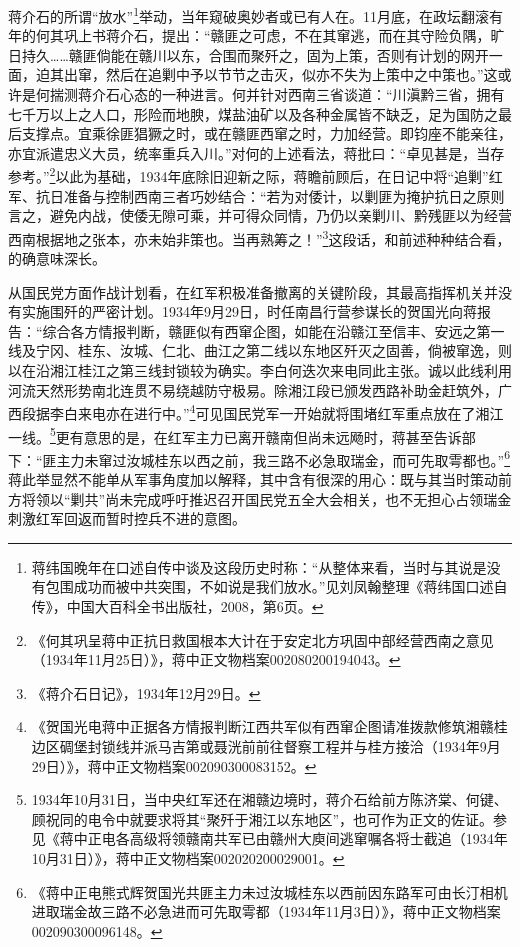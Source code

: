 蒋介石的所谓“放水”\footnote{蒋纬国晚年在口述自传中谈及这段历史时称：“从整体来看，当时与其说是没有包围成功而被中共突围，不如说是我们放水。”见刘凤翰整理《蒋纬国口述自传》，中国大百科全书出版社，2008，第6页。}举动，当年窥破奥妙者或已有人在。11月底，在政坛翻滚有年的何其巩上书蒋介石，提出：“赣匪之可虑，不在其窜逃，而在其守险负隅，旷日持久……赣匪倘能在赣川以东，合围而聚歼之，固为上策，否则有计划的网开一面，迫其出窜，然后在追剿中予以节节之击灭，似亦不失为上策中之中策也。”这或许是何揣测蒋介石心态的一种进言。何并针对西南三省谈道：“川滇黔三省，拥有七千万以上之人口，形险而地腴，煤盐油矿以及各种金属皆不缺乏，足为国防之最后支撑点。宜乘徐匪猖獗之时，或在赣匪西窜之时，力加经营。即钧座不能亲往，亦宜派遣忠义大员，统率重兵入川。”对何的上述看法，蒋批曰：“卓见甚是，当存参考。”\footnote{《何其巩呈蒋中正抗日救国根本大计在于安定北方巩固中部经营西南之意见（1934年11月25日）》，蒋中正文物档案002080200194043。}以此为基础，1934年底除旧迎新之际，蒋瞻前顾后，在日记中将“追剿”红军、抗日准备与控制西南三者巧妙结合：“若为对倭计，以剿匪为掩护抗日之原则言之，避免内战，使倭无隙可乘，并可得众同情，乃仍以亲剿川、黔残匪以为经营西南根据地之张本，亦未始非策也。当再熟筹之！”\footnote{《蒋介石日记》，1934年12月29日。}这段话，和前述种种结合看，的确意味深长。


从国民党方面作战计划看，在红军积极准备撤离的关键阶段，其最高指挥机关并没有实施围歼的严密计划。1934年9月29日，时任南昌行营参谋长的贺国光向蒋报告：“综合各方情报判断，赣匪似有西窜企图，如能在沿赣江至信丰、安远之第一线及宁冈、桂东、汝城、仁北、曲江之第二线以东地区歼灭之固善，倘被窜逸，则以在沿湘江桂江之第三线封锁较为确实。李白何迭次来电同此主张。诚以此线利用河流天然形势南北连贯不易绕越防守极易。除湘江段已颁发西路补助金赶筑外，广西段据李白来电亦在进行中。”\footnote{《贺国光电蒋中正据各方情报判断江西共军似有西窜企图请准拨款修筑湘赣桂边区碉堡封锁线并派马吉第或聂洸前前往督察工程并与桂方接洽（1934年9月29日）》，蒋中正文物档案002090300083152。}可见国民党军一开始就将围堵红军重点放在了湘江一线。\footnote{1934年10月31日，当中央红军还在湘赣边境时，蒋介石给前方陈济棠、何键、顾祝同的电令中就要求将其“聚歼于湘江以东地区”，也可作为正文的佐证。参见《蒋中正电各高级将领赣南共军已由赣州大庾间逃窜嘱各将士截追（1934年10月31日）》，蒋中正文物档案002020200029001。}更有意思的是，在红军主力已离开赣南但尚未远飏时，蒋甚至告诉部下：“匪主力未窜过汝城桂东以西之前，我三路不必急取瑞金，而可先取雩都也。”\footnote{《蒋中正电熊式辉贺国光共匪主力未过汝城桂东以西前因东路军可由长汀相机进取瑞金故三路不必急进而可先取雩都（1934年11月3日）》，蒋中正文物档案002090300096148。}蒋此举显然不能单从军事角度加以解释，其中含有很深的用心：既与其当时策动前方将领以“剿共”尚未完成呼吁推迟召开国民党五全大会相关，也不无担心占领瑞金刺激红军回返而暂时控兵不进的意图。


